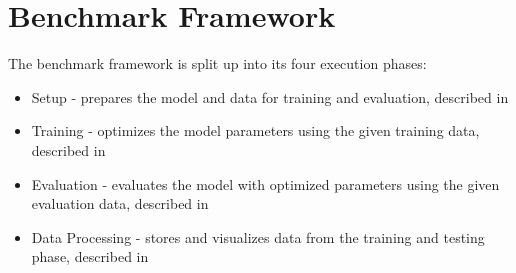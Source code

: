 \documentclass[draft,final]{vutinfth} %
\begin{document}
    \section{Benchmark Framework} \label{benchmark_framework}
    The benchmark framework is split up into its four execution phases:
    \begin{itemize}
        \item{}
        Setup - prepares the model and data for training and evaluation, described in 
        \item{}
        Training - optimizes the model parameters using the given training data, described in 
        \item{}
        Evaluation - evaluates the model with optimized parameters using the given evaluation data, described in 
        \item{}
        Data Processing - stores and visualizes data from the training and testing phase, described in 
    \end{itemize}
\end{document}
